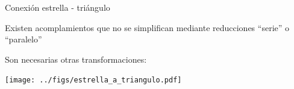 \documentclass[aspectratio=169, xcolor={usenames,svgnames,dvipsnames}]{beamer}
\begin{document}

\begin{frame}{Conexión estrella - triángulo} 

    \vspace{2mm}
    Existen acomplamientos que no se simplifican mediante reducciones ``serie'' o ``paralelo''
    
    \vspace{1mm}
    Son necesarias \alert{otras transformaciones}:
    
    \vspace{-2mm}
    \begin{center}              
        \texttt{[image: ../figs/estrella\_a\_triangulo.pdf]}
    \end{center}    
\end{frame}

\end{document}
